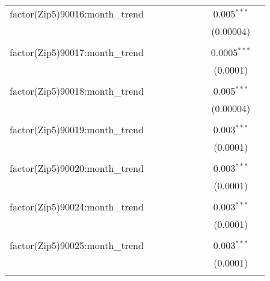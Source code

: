 \begin{table}[H]
{\begin{tabular}{@{\extracolsep{5pt}}lcccccccc}
  factor(Zip5)90016:month\_trend &  &  &  &  &  &  & 0.005$^{***}$ &  \\  

   &  &  &  &  &  &  & (0.00004) &  \\  

   & & & & & & & & \\  

  factor(Zip5)90017:month\_trend &  &  &  &  &  &  & 0.0005$^{***}$ &  \\  

   &  &  &  &  &  &  & (0.0001) &  \\  

   & & & & & & & & \\  

  factor(Zip5)90018:month\_trend &  &  &  &  &  &  & 0.005$^{***}$ &  \\  

   &  &  &  &  &  &  & (0.00004) &  \\  

   & & & & & & & & \\  

  factor(Zip5)90019:month\_trend &  &  &  &  &  &  & 0.003$^{***}$ &  \\  

   &  &  &  &  &  &  & (0.0001) &  \\  

   & & & & & & & & \\  

  factor(Zip5)90020:month\_trend &  &  &  &  &  &  & 0.003$^{***}$ &  \\  

   &  &  &  &  &  &  & (0.0001) &  \\  

   & & & & & & & & \\  

  factor(Zip5)90024:month\_trend &  &  &  &  &  &  & 0.003$^{***}$ &  \\  

   &  &  &  &  &  &  & (0.0001) &  \\  

   & & & & & & & & \\  

  factor(Zip5)90025:month\_trend &  &  &  &  &  &  & 0.003$^{***}$ &  \\  

   &  &  &  &  &  &  & (0.0001) &  \\  

   & & & & & & & & \\  


\end{tabular}}
\end{table}
